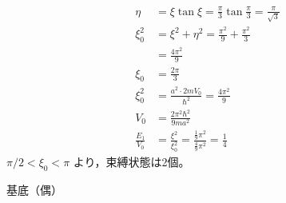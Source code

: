 \begin{align*}
\eta&=\xi\tan\xi=\frac{\pi}{3}\tan\frac{\pi}{3}=\frac{\pi}{\sqrt{3}}\\
\xi_{0}^{2}&=\xi^{2}+\eta^{2}=\frac{\pi^{2}}{9}+\frac{\pi^{2}}{3}\\
&=\frac{4\pi^{2}}{9}\\
\xi_{0}&=\frac{2\pi}{3}\\
\xi_{0}^{2}&=\frac{a^{2}\cdot2mV_{0}}{\hbar^{2}}=\frac{4\pi^{2}}{9}\\
V_{0}&=\frac{2\pi^{2}\hbar^{2}}{9ma^{2}}\\
\frac{E_{1}}{V_{0}}&=\frac{\xi^{2}}{\xi_{0}^{2}}=\frac{\frac{1}{9}\pi^{2}}{\frac{4}{9}\pi^{2}}=\frac{1}{4}
\end{align*}
$\pi/2<\xi_{0}<\pi$ より，束縛状態は2個。

基底（偶）

